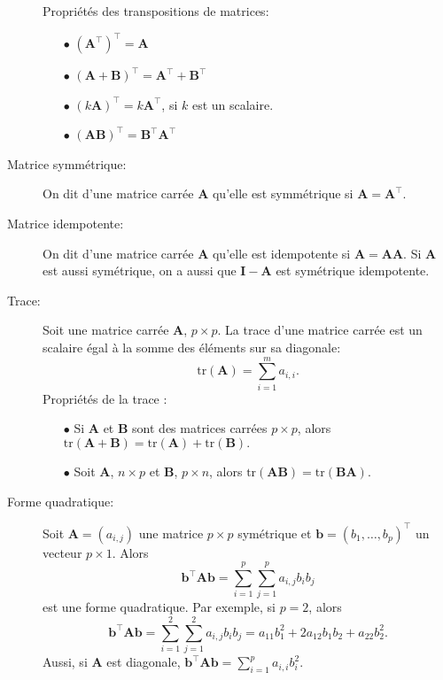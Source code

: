\begin{description}
Propriétés des transpositions de matrices:
\begin{itemize}
\item[$\bullet$] $(\mathbf{A}^{\top})^{\top}=\mathbf{A}$
\item[$\bullet$] $(\mathbf{A}+\mathbf{B})^{\top}=\mathbf{A}^{\top}+\mathbf{B}^{\top}$
\item[$\bullet$] $(k\mathbf{A})^{ \top}=k\mathbf{A}^{\top}$, si  $k$ est un scalaire.
\item[$\bullet$] $(\mathbf{A}\mathbf{B})^{\top}=\mathbf{B}^{\top}\mathbf{A}^{\top}$
\end{itemize}

\item[Matrice symmétrique:] On dit d'une matrice carrée $\mathbf{A}$ qu'elle est symmétrique si $\mathbf{A}=\mathbf{A}^{\top}$.
\item[Matrice idempotente:] On dit d'une matrice carrée $\mathbf{A}$ qu'elle est idempotente si $\mathbf{A}=\mathbf{A}\mathbf{A}$. Si $\mathbf{A}$ est aussi symétrique, on a aussi que $\mathbf{I-A}$ est symétrique idempotente.

\item [Trace:] Soit une matrice carrée $\mathbf{A}$, $p\times p$.  La trace d'une matrice carrée est un scalaire égal à la somme des éléments sur sa diagonale: 
$$
\mbox{tr}(\mathbf{A})=\sum_{i=1}^m a_{i,i}.
$$
Propriétés de la trace :
\begin{itemize}
\item[$\bullet$] Si $\mathbf{A}$ et $\mathbf{B}$ sont des matrices carrées $p\times p$, alors $\mbox{tr}(\mathbf{A}+\mathbf{B})=\mbox{tr}(\mathbf{A})+\mbox{tr}(\mathbf{B}).$
\item[$\bullet$] Soit $\mathbf{A}$, $n\times p$ et $\mathbf{B}$, $p\times n$, alors $\mbox{tr}(\mathbf{AB})=\mbox{tr}(\mathbf{BA}).$ 
\end{itemize}

\item[Forme quadratique:] Soit $\mathbf{A} = (a_{i,j})$ une matrice $p \times p$ symétrique et
$\mathbf{b} = (b_1, \ldots, b_p)^\top$ un vecteur $p\times 1$. Alors
\begin{displaymath}
  \mathbf{b^\top A b} = \sum_{i=1}^p \sum_{j=1}^p a_{i,j} b_i b_j
\end{displaymath}
est une forme quadratique. Par exemple, si $p=2$, alors
$$
  \mathbf{b^\top Ab}
  = \sum_{i=1}^2 \sum_{j=1}^2 a_{i,j} b_i b_j 
  = a_{11} b_1^2 + 2 a_{12} b_1 b_2 + a_{22} b_2^2.
$$
Aussi, si $\mathbf{A}$ est diagonale, $\mathbf{b^\top Ab} = \sum_{i=1}^p a_{i,i} b_i^2$.

\end{description}

